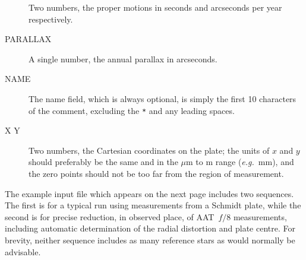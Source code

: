 \documentclass[twoside,11pt]{article}
\newcommand{\xlabel}[1]{}
\renewcommand{\_}{\texttt{\symbol{95}}}
\begin{document}
\begin{description}
Two numbers, the proper motions in seconds and arcseconds per year
respectively.

\goodbreak
\item[\xlabel{PARALLAX}PARALLAX]\mbox{}

A single number, the annual parallax in arcseconds.

\goodbreak
\item[\xlabel{NAME}NAME]\mbox{}

The name field, which is always optional, is simply the first 10
characters of the comment, excluding the \texttt{*} and any leading
spaces.

\goodbreak
\item[\xlabel{X_Y}X Y]\mbox{}

Two numbers, the Cartesian coordinates on the plate; the units of $x$
and $y$ should preferably be the same and in the $\mu$m to m range
(\emph{e.g.}\ mm), and the zero points should not be too far from the
region of measurement.

\end{description}

The example input file which appears on the next page includes two
sequences.  The first is for a typical run using measurements from a
Schmidt plate, while the second is for precise reduction, in observed
place, of AAT~$f/8$ measurements, including automatic determination of
the radial distortion and plate centre.  For brevity, neither sequence
includes as many reference stars as would normally be advisable.
\end{document}
